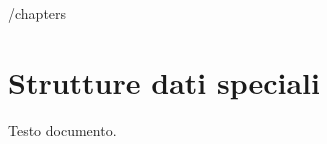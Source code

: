 /chapters%

\ifsubfile
\pagestyle{plain}
\setcounter{chapter}{9}


\fi
\chapter{Strutture dati speciali}

Testo documento.

\ifsubfile

\fi
